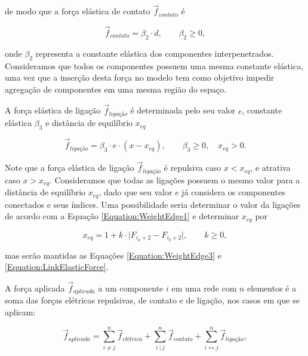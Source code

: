 \noindent
de modo que a força elástica de contato $\vec{f}_{contato}$ é

\begin{equation}
	\label{Equation:ContactElasticForce}
	\vec{f}_{contato} = \beta_2 \cdot d, \qquad \beta_2 \geq 0,
\end{equation}

\noindent
onde $\beta_2$ representa a constante elástica dos componentes interpenetrados.
Consideramos que todos os componentes possuem uma mesma constante elástica, uma
vez que a inserção desta força no modelo tem como objetivo impedir agregação de
componentes em uma mesma região do espaço.

A força elástica de ligação $\vec{f}_{ligação}$ é determinada pelo seu valor
$e$, constante elástica $\beta_3$ e distância de equilíbrio $x_{eq}$

\begin{equation}
	\label{Equation:LinkElasticForce}
	\vec{f}_{ligação} = \beta_3 \cdot e \cdot (x - x_{eq}), \qquad \beta_3 \geq 0, \quad x_{eq} > 0.
\end{equation}

Note que a força elástica de ligação $\vec{f}_{ligação}$ é repulsiva caso
$x < x_{eq}$, e atrativa caso $x > x_{eq}$.
Consideramos que todas as ligações possuem o mesmo valor para a distância de
equilíbrio $x_{eq}$, dado que seu valor $e$ já considera os componentes
conectados e seus índices.
Uma possibilidade seria determinar o valor da ligações de acordo com a Equação
\ref{Equation:WeightEdge1} e determinar $x_{eq}$ por

\begin{equation}
	\label{Equation:EquilibriumDistanceSuggestion}
	x_{eq} = 1 + k \cdot \lvert F_{i_a+2} - F_{i_b+2} \rvert, \qquad k \geq 0,
\end{equation}

\noindent
mas serão mantidas as Equações \ref{Equation:WeightEdge3} e \ref{Equation:LinkElasticForce}.

A força aplicada $\vec{f}_{aplicada}$ a um componente $i$ em uma rede com $n$
elementos é a soma das forças elétricas repulsivas, de contato e de ligação, nos
casos em que se aplicam:

\begin{equation}
	\label{Equation:AppliedForce}
	\vec{f}_{aplicada} = \sum_{i \neq j}^{n} \vec{f}_{elétrica}
		+ \sum_{i \  | \  j}^{n} \vec{f}_{contato}
		+ \sum_{i \leftrightarrow j}^{n} \vec{f}_{ligação},
\end{equation}

